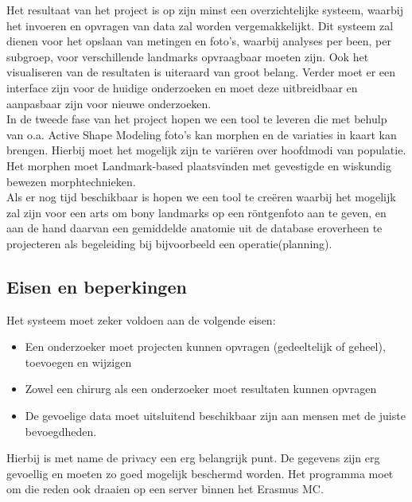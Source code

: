 Het resultaat van het project is op zijn minst een overzichtelijke systeem, waarbij het invoeren en opvragen van data zal worden vergemakkelijkt.
Dit systeem zal dienen voor het opslaan van metingen en foto's, waarbij analyses per been, per subgroep, voor verschillende landmarks opvraagbaar moeten zijn.
Ook het visualiseren van de resultaten is uiteraard van groot belang.
Verder moet er een interface zijn voor de huidige onderzoeken en moet deze uitbreidbaar en aanpasbaar zijn voor nieuwe onderzoeken. 
\\
In de tweede fase van het project hopen we een tool te leveren die met behulp van o.a. Active Shape Modeling foto's kan morphen en de variaties in kaart kan brengen.
Hierbij moet het mogelijk zijn te vari\"eren over hoofdmodi van populatie.
Het morphen moet Landmark-based plaatsvinden met gevestigde en wiskundig bewezen morphtechnieken.
\\
Als er nog tijd beschikbaar is hopen we een tool te cre\"eren waarbij het mogelijk zal zijn voor een arts om bony landmarks op een r\"ontgenfoto aan te geven, en aan de hand daarvan een gemiddelde anatomie uit de database eroverheen te projecteren als begeleiding bij bijvoorbeeld een operatie(planning).

\subsection{Eisen en beperkingen}


Het systeem moet zeker voldoen aan de volgende eisen:
\begin{itemize}
  \item Een onderzoeker moet projecten kunnen opvragen (gedeeltelijk of geheel), toevoegen en wijzigen
  \item Zowel een chirurg als een onderzoeker moet resultaten kunnen opvragen
  \item De gevoelige data moet uitsluitend beschikbaar zijn aan mensen met de juiste bevoegdheden.
\end{itemize}
Hierbij is met name de privacy een erg belangrijk punt.
De gegevens zijn erg gevoellig en moeten zo goed mogelijk beschermd worden.
Het programma moet om die reden ook draaien op een server binnen het Erasmus MC.

